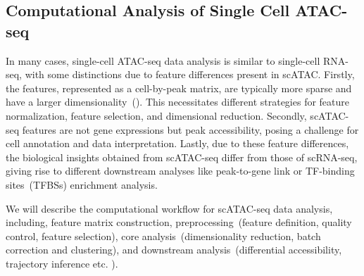 \subsection{Computational Analysis of Single Cell ATAC-seq}
\label{background:sec2:scATAC}
In many cases, single-cell ATAC-seq data analysis is similar to single-cell RNA-seq, with some distinctions due to feature differences present in scATAC. Firstly, the features, represented as a cell-by-peak matrix, are typically more sparse and have a larger dimensionality~(). This necessitates different strategies for feature normalization, feature selection, and dimensional reduction. Secondly, scATAC-seq features are not gene expressions but peak accessibility, posing a challenge for cell annotation and data interpretation. Lastly, due to these feature differences, the biological insights obtained from scATAC-seq differ from those of scRNA-seq, giving rise to different downstream analyses like peak-to-gene link or TF-binding sites~(TFBSs) enrichment analysis.

We will describe the computational workflow for scATAC-seq data analysis, including, feature matrix construction, preprocessing~(feature definition, quality control, feature selection), core analysis~(dimensionality reduction, batch correction and clustering), and downstream analysis~(differential accessibility, trajectory inference etc. ).

